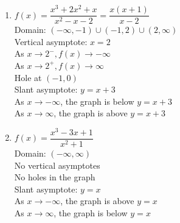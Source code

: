 \begin{multicols}{2}
\begin{enumerate}
\setcounter{enumi}{\value{HW}}


\item $f(x) = \dfrac{x^3+2x^2+x}{x^{2} -x-2} = \dfrac{x(x+1)}{x - 2}$\\
Domain: $(-\infty, -1) \cup (-1, 2) \cup (2, \infty)$\\
Vertical asymptote: $x = 2$\\
As $x \rightarrow 2^{-}, f(x) \rightarrow -\infty$\\
As $x \rightarrow 2^{+}, f(x) \rightarrow \infty$\\
Hole at $(-1,0)$ \\
Slant asymptote: $y=x+3$ \\
As $x \rightarrow -\infty$, the graph is below $y=x+3$\\
As $x \rightarrow \infty$, the graph is above $y=x+3$\\

\vfill

\columnbreak

\item $f(x) = \dfrac{x^3-3x+1}{x^2+1}$\\
Domain: $(-\infty, \infty)$\\
No vertical asymptotes \\
No holes in the graph \\
Slant asymptote: $y=x$ \\
As $x \rightarrow -\infty$, the graph is above $y=x$ \\
As $x \rightarrow \infty$, the graph is below $y=x$  \\


\setcounter{HW}{\value{enumi}}
\end{enumerate}
\end{multicols}


